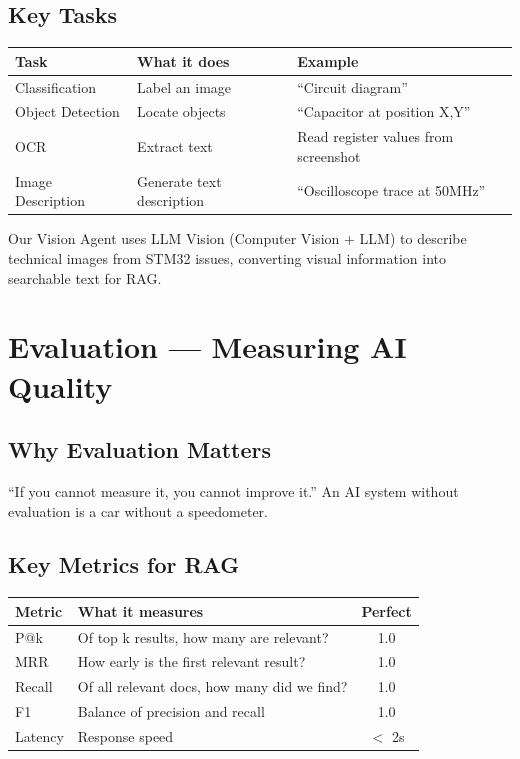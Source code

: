 \documentclass[11pt,a4paper]{report}
\begin{document}
\section{Key Tasks}

\begin{table}[h]
\centering
\begin{tabularx}{\textwidth}{l X X}
\toprule
\textbf{Task} & \textbf{What it does} & \textbf{Example} \\
\midrule
Classification & Label an image & ``Circuit diagram'' \\
Object Detection & Locate objects & ``Capacitor at position X,Y'' \\
OCR & Extract text & Read register values from screenshot \\
Image Description & Generate text description & ``Oscilloscope trace at 50MHz'' \\
\bottomrule
\end{tabularx}
\end{table}

\begin{projectbox}
Our Vision Agent uses LLM Vision (Computer Vision + LLM) to describe technical images from STM32 issues, converting visual information into searchable text for RAG.
\end{projectbox}

\chapter{Evaluation --- Measuring AI Quality}

\section{Why Evaluation Matters}

``If you cannot measure it, you cannot improve it.'' An AI system without evaluation is a car without a speedometer.

\section{Key Metrics for RAG}

\begin{table}[h]
\centering
\begin{tabularx}{\textwidth}{l X c}
\toprule
\textbf{Metric} & \textbf{What it measures} & \textbf{Perfect} \\
\midrule
P@k & Of top k results, how many are relevant? & 1.0 \\
MRR & How early is the first relevant result? & 1.0 \\
Recall & Of all relevant docs, how many did we find? & 1.0 \\
F1 & Balance of precision and recall & 1.0 \\
Latency & Response speed & $<$ 2s \\
\bottomrule
\end{tabularx}
\end{table}
\end{document}
